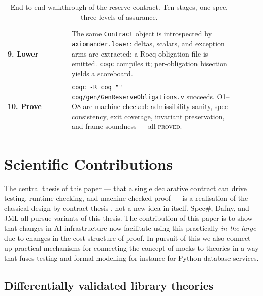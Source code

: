 \documentclass[11pt,a4paper]{article}
\begin{document}
\begin{table}[t]
\begin{tabular}{@{}p{0.25\linewidth}p{0.65\linewidth}@{}}
\textbf{9. Lower} &
  The same \texttt{Contract} object is introspected by \texttt{axiomander.lower}: deltas,
  scalars, and exception arms are extracted; a Rocq obligation file is emitted.
  \texttt{coqc} compiles it; per-obligation bisection yields a scoreboard. \\[8pt]

\textbf{10. Prove} &
  \texttt{coqc -R coq "" coq/gen/GenReserveObligations.v} succeeds.
  O1--O8 are machine-checked: admissibility sanity, spec consistency, exit coverage,
  invariant preservation, and frame soundness --- all \textsc{proved}. \\
\bottomrule
\end{tabular}
\caption{End-to-end walkthrough of the reserve contract.  Ten stages,
one spec, three levels of assurance.}
\label{tab:walkthrough}
\end{table}

\section{Scientific Contributions}\label{sec:contributions}

The central thesis of this paper --- that a single declarative
contract can drive testing, runtime checking, and machine-checked
proof --- is a realisation of the classical design-by-contract thesis
\cite{Meyer92,Leino10}, not a new idea in itself.  Spec\#, Dafny, and
JML all pursue variants of this thesis. The contribution of this paper
is to show that changes in AI infrastructure now facilitate using this
practically \emph{in the large} due to changes in the cost structure of
proof.  In pursuit of this we also connect up practical mechanisms for
connecting the concept of mocks to theories in a way that fuses
testing and formal modelling for instance for Python database services.

\subsection{Differentially validated library theories}
\label{sec:contrib-theories}
\end{document}
